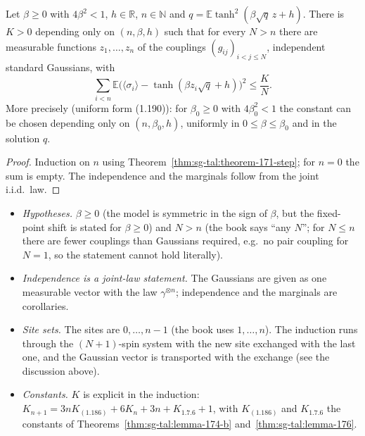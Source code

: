 \begin{theorem}[Theorem~1.7.1]
\label{thm:sg-tal:theorem-171}
  \leanok
{}
Let $\beta\ge0$ with $4\beta^2<1$, $h\in\mathbb R$, $n\in\mathbb N$ and $q=\mathbb E\tanh^2(\beta\sqrt q\,z+h)$.  There is $K>0$ depending only on $(n,\beta,h)$ such that for every $N>n$ there are measurable functions $z_1,\dots,z_n$ of the couplings $(g_{ij})_{i<j\le N}$, independent standard Gaussians, with
\[
\sum_{i<n}\mathbb E\bigl(\langle\sigma_i\rangle-\tanh(\beta z_i\sqrt q+h)\bigr)^2\le\frac KN.
\]
More precisely (uniform form (1.190)): for $\beta_0\ge0$ with $4\beta_0^2<1$ the constant can be chosen depending only on $(n,\beta_0,h)$, uniformly in $0\le\beta\le\beta_0$ and in the solution $q$.
\end{theorem}
\begin{proof}
  \leanok
Induction on $n$ using Theorem~\ref{thm:sg-tal:theorem-171-step}; for $n=0$ the sum is empty.  The independence and the marginals follow from the joint i.i.d.\ law.
\end{proof}

\begin{remark}
\label{rem:sg-tal:dev-171}
\begin{itemize}
\item \emph{Hypotheses.}  $\beta\ge0$ (the model is symmetric in the sign of $\beta$, but the fixed-point shift is stated for $\beta\ge0$) and $N>n$ (the book says ``any $N$''; for $N\le n$ there are fewer couplings than Gaussians required, e.g.\ no pair coupling for $N=1$, so the statement cannot hold literally).
\item \emph{Independence is a joint-law statement.}  The Gaussians are given as one measurable vector with the law $\gamma^{\otimes n}$; independence and the marginals are corollaries.
\item \emph{Site sets.}  The sites are $0,\dots,n-1$ (the book uses $1,\dots,n$).  The induction runs through the $(N+1)$-spin system with the new site exchanged with the last one, and the Gaussian vector is transported with the exchange (see the discussion above).
\item \emph{Constants.}  $K$ is explicit in the induction: $K_{n+1}=3nK_{(1.186)}+6K_n+3n+K_{1.7.6}+1$, with $K_{(1.186)}$ and $K_{1.7.6}$ the constants of Theorems~\ref{thm:sg-tal:lemma-174-b} and~\ref{thm:sg-tal:lemma-176}.
\end{itemize}
\end{remark}

